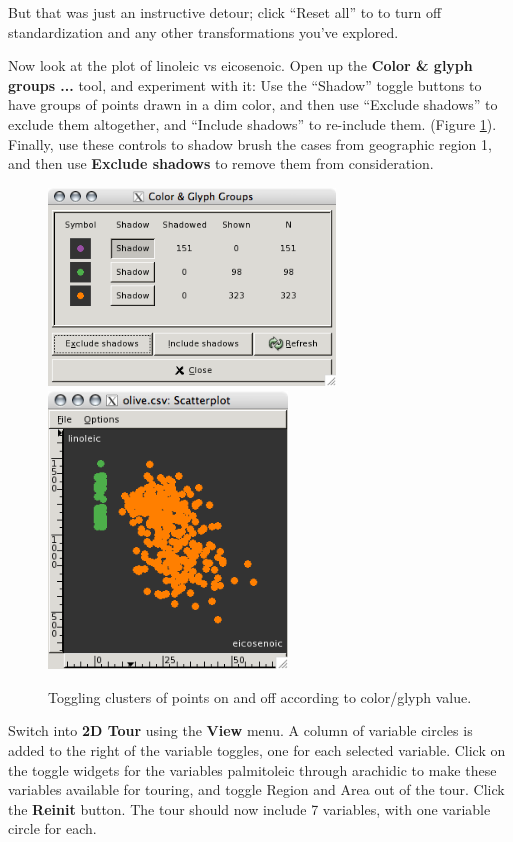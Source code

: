 \documentclass[11pt]{article}
\def\Widget#1{\textbf{#1}}
\begin{document}
But that was just an instructive detour; click ``Reset all'' to
to turn off standardization and any other transformations you've
explored.

Now look at the plot of linoleic vs eicosenoic. Open up the
\Widget{Color \& glyph groups ...} tool, and experiment with it: Use
the ``Shadow'' toggle buttons to have groups of points drawn in a dim
color, and then use ``Exclude shadows'' to exclude them altogether,
and ``Include shadows'' to re-include them.  (Figure \ref{fig5}).
Finally, use these controls to shadow brush the cases from geographic
region 1, and then use \Widget{Exclude shadows} to remove them from
consideration.

\begin{figure}[htp]
\centerline{\includegraphics[width=3in]{Figures/olive-brush3.png}\hspace{0.2in}\includegraphics[width=2.5in]{Figures/olive-brush4.png}}
\caption{Toggling clusters of points on and off according to color/glyph value.}
\label{fig5}
\end{figure}

Switch into \Widget{2D Tour} using the \Widget{View} menu. A column of
variable circles is added to the right of the variable toggles, one
for each selected variable.  Click on the toggle widgets for the
variables palmitoleic through arachidic to make these variables
available for touring, and toggle Region and Area out of the tour.
Click the \Widget{Reinit} button.  The tour should now include 7
variables, with one variable circle for each.
\end{document}
